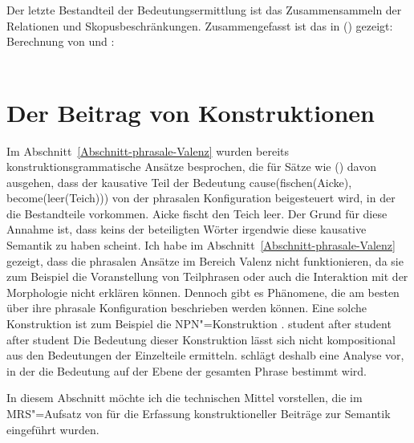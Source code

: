 Der letzte Bestandteil der Bedeutungsermittlung ist das Zusammensammeln der Relationen und
Skopusbeschränkungen. Zusammengefasst ist das in () gezeigt:
\ea
\label{constraint-collect-rels-collect-hcons}
Berechnung von \rels und \hcons:\\
 \impl\\[1mm]
\z




%


\section{Der Beitrag von Konstruktionen}
\label{sec-Semantik-C-CONT}

Im Abschnitt~\ref{Abschnitt-phrasale-Valenz} wurden bereits konstruktionsgrammatische Ansätze
besprochen, die für Sätze wie () davon ausgehen, dass der kausative Teil der Bedeutung
cause(fischen(Aicke), become(leer(Teich))) von der phrasalen Konfiguration beigesteuert wird, in der
die Bestandteile vorkommen.
\ea
Aicke fischt den Teich leer.
\z
Der Grund für diese Annahme ist, dass keins der beteiligten Wörter irgendwie diese kausative
Semantik zu haben scheint. Ich habe im Abschnitt~\ref{Abschnitt-phrasale-Valenz} gezeigt, dass die
phrasalen Ansätze im Bereich Valenz nicht funktionieren, da sie zum Beispiel die Voranstellung von
Teilphrasen oder auch die Interaktion mit der Morphologie nicht erklären können. Dennoch gibt es
Phänomene, die am besten über ihre phrasale Konfiguration beschrieben werden können. Eine solche
Konstruktion ist zum Beispiel die NPN"=Konstruktion \parencites{Matsuyama2004a,Jackendoff2008a,Bargmann2015a}[Abschnitt~6.2]{Bargmann2023a-u}.
\ea
student after student after student
\z
Die Bedeutung dieser Konstruktion lässt sich nicht kompositional aus den Bedeutungen der Einzelteile
ermitteln. \citet{Bargmann2015a} schlägt deshalb eine Analyse vor, in der die Bedeutung auf der
Ebene der gesamten Phrase bestimmt wird.

In diesem Abschnitt möchte ich die technischen Mittel vorstellen, die im MRS"=Aufsatz von \citet{CFPS2005a} für
die Erfassung konstruktioneller Beiträge zur Semantik eingeführt wurden.

